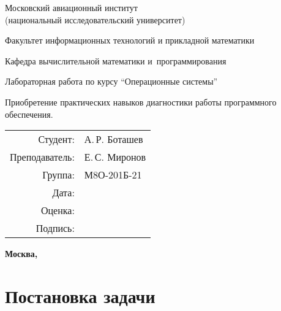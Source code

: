 \documentclass[pdf, unicode, 12pt, a4paper,oneside,fleqn]{article}
\begin{document}
\begin{titlepage}
    \begin{center}
        \bfseries

        {\Large Московский авиационный институт\\ (национальный исследовательский университет)}
        
        \vspace{48pt}
        
        {\large Факультет информационных технологий и прикладной математики}
        
        \vspace{36pt}
        
        {\large Кафедра вычислительной математики и~программирования}
        
        \vspace{48pt}
        
        Лабораторная работа  по курсу \enquote{Операционные системы}

        \vspace{48pt}

        Приобретение практических навыков диагностики работы программного обеспечения.
    \end{center}
    
    \vspace{150pt}
    
    \begin{flushright}
    \begin{tabular}{rl}
    Студент: & А.\,Р. Боташев \\
    Преподаватель: & Е.\,С. Миронов \\
    Группа: & М8О-201Б-21 \\
    Дата: & \\
    Оценка: & \\
    Подпись: & \\
    \end{tabular}
    \end{flushright}
    
    \vfill
    
    \begin{center}
    \bfseries
    Москва, \the\year
    \end{center}
\end{titlepage}
    
\pagebreak

\section{Постановка задачи}
\end{document}
